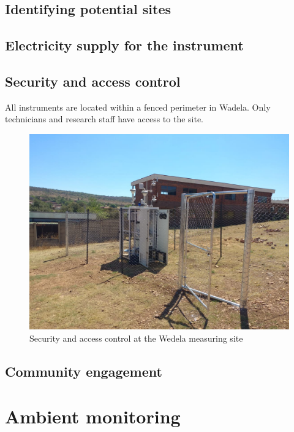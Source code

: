 \documentclass{nwureport}
\begin{document}
\section{Identifying potential sites}

\section{Electricity supply for the instrument}

\section{Security and access control}
All instruments are located within a fenced perimeter in Wadela. Only technicians and
research staff have access to the site.

\begin{figure}[!htb]
    \centering
    \includegraphics[width=\textwidth]{images/wedela_4.jpeg}
    \caption[Security and access control at the Wedela measuring site]{Security and access control at the Wedela measuring site}
    \label{fig:wadela_fence}
\end{figure}

\section{Community engagement}


\chapter{Ambient monitoring}
\end{document}

